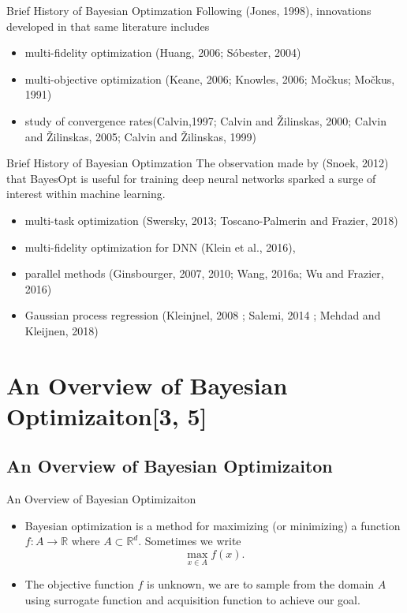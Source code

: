 \documentclass{beamer}
\begin{document}
%
\begin{frame}{Brief History of Bayesian Optimzation}
Following (Jones, 1998), innovations developed in that same literature includes
\begin{itemize}
\item
multi-fidelity optimization (Huang, 2006; Sóbester, 2004)
\item
multi-objective optimization (Keane, 2006; Knowles, 2006; Močkus; Močkus, 1991)
\item
study of convergence rates(Calvin,1997; Calvin and Žilinskas, 2000; Calvin and Žilinskas, 2005; Calvin and Žilinskas, 1999)
\end{itemize}
\end{frame}

%
\begin{frame}{Brief History of Bayesian Optimzation}
The observation made by (Snoek, 2012) that BayesOpt is useful for training deep neural networks sparked a surge of interest within machine learning.
\begin{itemize}
\item
multi-task optimization (Swersky, 2013; Toscano-Palmerin and Frazier, 2018)
\item
multi-fidelity optimization for DNN (Klein et al., 2016),
\item
parallel methods (Ginsbourger, 2007, 2010; Wang, 2016a; Wu and Frazier, 2016)
\item
Gaussian process regression (Kleinjnel, 2008 ; Salemi, 2014 ; Mehdad and Kleijnen, 2018)
\end{itemize}
\end{frame}

\section{An Overview of Bayesian Optimizaiton[3, 5]}

\subsection{An Overview of Bayesian Optimizaiton}
\begin{frame}{An Overview of Bayesian Optimizaiton}
\begin{itemize}
\item
Bayesian optimization is a method for maximizing (or minimizing) a function \(f:A\to\mathbb R\) where \(A\subset\mathbb R^d\).
Sometimes we write
\[\max_{x\in A}f(x).\]
\item
The \alert{objective function} \(f\) is unknown, we are to sample from the domain \(A\) using \alert{surrogate function} and \alert{acquisition function} to achieve our goal.
\end{itemize}
\end{frame}
\end{document}

